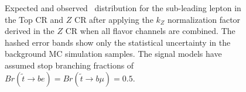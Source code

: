 \begin{figure}[p]
  \centering
  \caption[
    Expected and observed \pt\ distribution for the sub-leading lepton in
    the Top CR and $Z$ CR after applying the $k_Z$ normalization factor derived
    in the $Z$ CR when all flavor channels are combined.
  ]{
    Expected and observed \pt\ distribution for the sub-leading lepton in
    the Top CR and $Z$ CR after applying the $k_Z$ normalization factor derived
    in the $Z$ CR when all flavor channels are combined.
    The hashed error bands show only the statistical uncertainty in the
    background MC simulation samples.
    The signal models have assumed stop branching fractions of
    $Br(\tilde{t}\rightarrow be) = Br(\tilde{t}\rightarrow b\mu) = 0.5$.
  }
  \label{fig:cr_lep_pt_1__w_norm_factor}
\end{figure}

